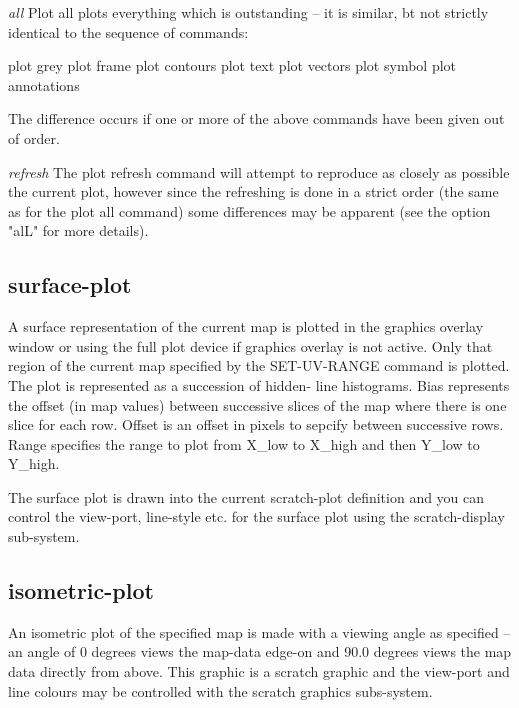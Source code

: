 {\em all}
\newline
Plot all plots everything which is outstanding -- it is similar, bt
not strictly identical to the sequence of commands:

  plot grey
  plot frame
  plot contours
  plot text
  plot vectors
  plot symbol
  plot annotations

The difference occurs if one or more of the above commands have been
given out of order.

{\em refresh}
\newline
The plot refresh command will attempt to reproduce as closely as possible
the current plot, however since the refreshing is done in a strict
order (the same as for the plot all command) some differences may be
apparent (see the option "alL" for more details).

\subsection{surface-plot}

A surface representation of the current map is plotted in the graphics
overlay window or using the full plot device if graphics overlay is not
active.  Only that region of the current map specified by the SET-UV-RANGE
command is plotted.  The plot is represented as a succession of hidden-
line histograms.  Bias represents the offset (in map values) between
successive slices of the map where there is one slice for each row.
Offset is an offset in pixels to sepcify between successive rows.
Range specifies the range to plot from X_low to X_high and then
Y_low to Y_high.

The surface plot is drawn into the current scratch-plot definition and
you can control the view-port, line-style etc. for the surface plot
using the scratch-display sub-system.

\subsection{isometric-plot}

An isometric plot of the specified map is made with a viewing angle
as specified -- an angle of 0 degrees views the map-data edge-on and
90.0 degrees views the map data directly from above.  This graphic
is a scratch graphic and the view-port and line colours may be controlled
with the scratch graphics subs-system.


